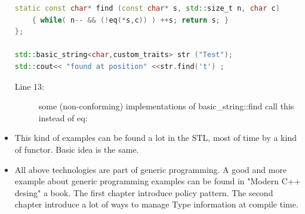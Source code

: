 \documentclass[a4paper,11pt,twoside]{book}
\begin{document}
\begin{itemize}
\begin{lstlisting}[frame=single, language=c++]
static const char* find (const char* s, std::size_t n, char c)
	{ while( n-- && (!eq(*s,c)) ) ++s; return s; }
};
	
std::basic_string<char,custom_traits> str ("Test");
std::cout<< "found at position" <<str.find('t') ;
\end{lstlisting}
\begin{description}
	\item[Line 13:] some (non-conforming) implementations of basic\_string::find call this instead of eq:
\end{description}

	
	\item This kind of examples can be found a lot in the STL, most of time by a kind of functor. Basic idea is the same.
	
	\item All above technologies are part of generic programming. A good and more example about generic programming examples can be found in "Modern C++ desing" a book. The first chapter introduce policy pattern. The second chapter introduce a lot of ways to manage Type information at compile time. 
	
\end{itemize}
\end{document}
